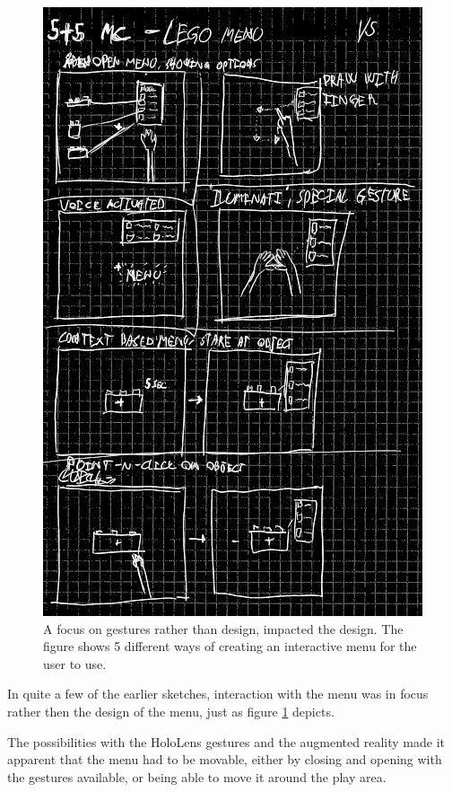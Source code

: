 \begin{figure}[h]
	\centering
	\includegraphics[width=0.7\linewidth]{figures/Menu/menu5}
	\caption{A focus on gestures rather than design, impacted the design. The figure shows 5 different ways of creating an interactive menu for the user to use.}
	\label{fig:menugesture}
\end{figure}
In quite a few of the earlier sketches, interaction with the menu was in focus rather then the design of the menu, just as figure \ref{fig:menugesture} depicts.\par
The possibilities with the HoloLens gestures and the augmented reality made it apparent that the menu had to be movable, either by closing and opening with the gestures available, or being able to move it around the play area. 

